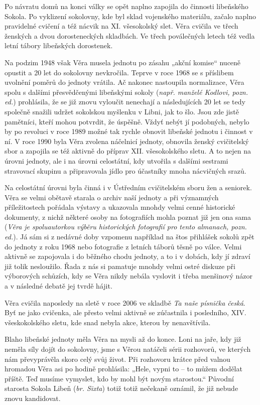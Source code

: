 Po návratu domů na konci války se opět naplno zapojila do činnosti
libeňského Sokola. Po vyklizení sokolovny, kde byl sklad vojenského
materiálu, začalo naplno pravidelné cvičení a též nácvik na XI.
všesokolský slet. Věra cvičila ve třech ženských a dvou dorosteneckých
skladbách. Ve třech poválečných letech též vedla letní tábory libeňských
dorostenek.

Na podzim 1948 však Věra musela jednotu po zásahu „akční komise`` nuceně
opustit a 20 let do sokolovny nevkročila. Teprve v roce 1968 se s
příslibem uvolnění poměrů do jednoty vrátila. Ač nakonec nastoupila
normalizace, Věra spolu s dalšími přesvědčenými libeňskými sokoly
(\emph{např. manželé Kodlovi, pozn. ed.}) prohlásila, že se již znovu
vyloučit nenechají a následujících 20 let se tedy společně snažili
udržet sokolskou myšlenku v Libni, jak to šlo. Jsou zde jistě pamětníci,
kteří mohou potvrdit, že úspěšně. Vždyť nebýt jí podobných, nebylo by po
revoluci v roce 1989 možné tak rychle obnovit libeňské jednotu i činnost
v ní. V roce 1990 byla Věra zvolena náčelnicí jednoty, obnovila ženský
cvičitelský sbor a zapojila se též aktivně do příprav XII. všesokolského
sletu. A to nejen na úrovni jednoty, ale i na úrovni celostátní, kdy
utvořila s dalšími sestrami stravovací skupinu a připravovala jídlo pro
účastníky mnoha nácvičných srazů.

Na celostátní úrovni byla činná i v Ústředním cvičitelském sboru žen a
seniorek. Věra se velmi obětavě starala o archiv naší jednoty a při
významných příležitostech pořádala výstavy a ukazovala mnohdy velmi
cenné historické dokumenty, z nichž některé osoby na fotografiích mohla
poznat již jen ona sama (\emph{Věra je spoluautorkou výběru historických
fotografií pro tento almanach, pozn. ed.}). Já sám si z nedávné doby
vzpomenu například na štos přihlášek sokolů zpět do jednoty z roku 1968
nebo fotografie z letních táborů těsně po válce. Velmi aktivně se
zapojovala i do běžného chodu jednoty, a to i v dobách, kdy jí zdraví
již tolik nesloužilo. Řada z nás si pamatuje mnohdy velmi ostré diskuze
při výborových schůzích, kdy se Věra nikdy nebála vyslovit i třeba
menšinový názor a v následné debatě jej tvrdě hájit.

Věra cvičila naposledy na sletě v roce 2006 ve skladbě \emph{Ta naše
písnička česká}. Byť ne jako cvičenka, ale přesto velmi aktivně se
zúčastnila i posledního, XIV. všeskokolského sletu, kde snad nebyla
akce, kterou by nenavštívila.

Blaho libeňské jednoty měla Věra na mysli až do konce. Loni na jaře, kdy
již neměla síly dojít do sokolovny, jsme s Věrou natáčeli sérii
rozhovorů, ve kterých nám převyprávěla skoro celý svůj život. Při
rozhovoru krátce před valnou hromadou Věra asi po hodině prohlásila:
„Hele, vypni to -- to můžem dodělat příště. Teď musíme vymyslet, kdo by
mohl být novým starostou.`` Původní starosta Sokola Libeň (\emph{br.
Sixta}) totiž totiž nečekaně oznámil, že již nebude znovu kandidovat.

